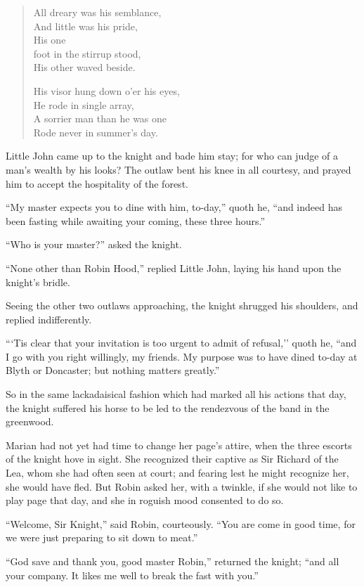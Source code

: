 \begin{quote}
All dreary was his semblance,\\
And little was his pride,\\
His one\\
foot in the stirrup stood,\\
His other waved beside.

His visor hung down o’er his eyes,\\
He rode in single array,\\
A sorrier man than he was one\\
Rode never in summer’s day.
\end{quote}

Little John came up to the knight and bade him stay; for who can judge
of a man's wealth by his looks? The outlaw bent his knee in all
courtesy, and prayed him to accept the hospitality of the forest.

``My master expects you to dine with him, to-day,'' quoth he, ``and
indeed has been fasting while awaiting your coming, these three hours.''

``Who is your master?'' asked the knight.

``None other than Robin Hood,'' replied Little John, laying his hand
upon the knight's bridle.

Seeing the other two outlaws approaching, the knight shrugged his
shoulders, and replied indifferently.

```Tis clear that your invitation is too urgent to admit of refusal,''
quoth he, ``and I go with you right willingly, my friends. My purpose
was to have dined to-day at Blyth or Doncaster; but nothing matters
greatly.''

So in the same lackadaisical fashion which had marked all his actions
that day, the knight suffered his horse to be led to the rendezvous of
the band in the greenwood.

Marian had not yet had time to change her page's attire, when the three
escorts of the knight hove in sight. She recognized their captive as Sir
Richard of the Lea, whom she had often seen at court; and fearing lest
he might recognize her, she would have fled. But Robin asked her, with a
twinkle, if she would not like to play page that day, and she in roguish
mood consented to do so.

``Welcome, Sir Knight,'' said Robin, courteously. ``You are come in good
time, for we were just preparing to sit down to meat.''

``God save and thank you, good master Robin,'' returned the knight;
``and all your company. It likes me well to break the fast with you.''

